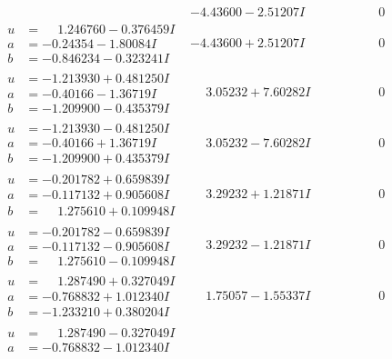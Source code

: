 \documentclass[1p]{elsarticle_modified}
\theoremstyle{definition}
\begin{document}
$$\begin{array}{c|c|c}
 & -4.43600 - 2.51207 I & \phantom{-0.000000 } 0 \\ \hline\begin{aligned}
u &= \phantom{-}1.246760 - 0.376459 I \\
a &= -0.24354 - 1.80084 I \\
b &= -0.846234 - 0.323241 I\end{aligned}
 & -4.43600 + 2.51207 I & \phantom{-0.000000 } 0 \\ \hline\begin{aligned}
u &= -1.213930 + 0.481250 I \\
a &= -0.40166 - 1.36719 I \\
b &= -1.209900 - 0.435379 I\end{aligned}
 & \phantom{-}3.05232 + 7.60282 I & \phantom{-0.000000 } 0 \\ \hline\begin{aligned}
u &= -1.213930 - 0.481250 I \\
a &= -0.40166 + 1.36719 I \\
b &= -1.209900 + 0.435379 I\end{aligned}
 & \phantom{-}3.05232 - 7.60282 I & \phantom{-0.000000 } 0 \\ \hline\begin{aligned}
u &= -0.201782 + 0.659839 I \\
a &= -0.117132 + 0.905608 I \\
b &= \phantom{-}1.275610 + 0.109948 I\end{aligned}
 & \phantom{-}3.29232 + 1.21871 I & \phantom{-0.000000 } 0 \\ \hline\begin{aligned}
u &= -0.201782 - 0.659839 I \\
a &= -0.117132 - 0.905608 I \\
b &= \phantom{-}1.275610 - 0.109948 I\end{aligned}
 & \phantom{-}3.29232 - 1.21871 I & \phantom{-0.000000 } 0 \\ \hline\begin{aligned}
u &= \phantom{-}1.287490 + 0.327049 I \\
a &= -0.768832 + 1.012340 I \\
b &= -1.233210 + 0.380204 I\end{aligned}
 & \phantom{-}1.75057 - 1.55337 I & \phantom{-0.000000 } 0 \\ \hline\begin{aligned}
u &= \phantom{-}1.287490 - 0.327049 I \\
a &= -0.768832 - 1.012340 I \\

\end{aligned}
\end{array}$$
\end{document}
